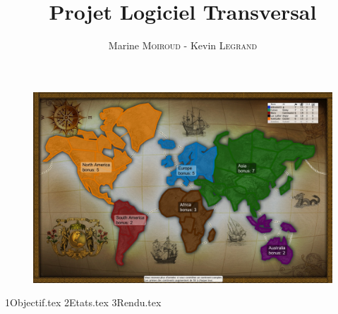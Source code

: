 \documentclass[12pt]{article}
\title{\textbf{\huge Projet Logiciel Transversal}}
\author{Marine \textsc{Moiroud} - Kevin \textsc{Legrand}}
\date{}
\newcommand*{\sourcedir}{Sources/}
\begin{document}
    
    \maketitle 
     \begin{figure}[!htbp]
        \centering
        \includegraphics[width=15cm]{Images/risk.jpg}
    \end{figure}
    \newpage
    \newpage
    \tableofcontents
    \newpage
    
    {1Objectif.tex}
    \newpage
    {2Etats.tex}
    \newpage
    {3Rendu.tex}
    \newpage
    \newpage
    \newpage
    
\end{document}
